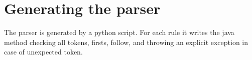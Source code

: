 \newpage\cleardoublepage{}
\section{Generating the parser}

The parser is generated by a python script. For each rule it writes the java method checking all tokens, firsts, follow, and throwing an explicit exception in case of unexpected token.





